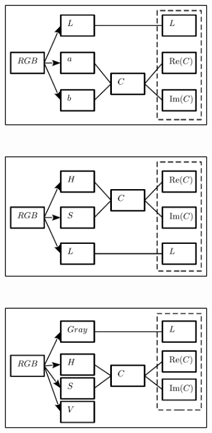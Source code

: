 \documentclass[journal]{IEEEtran}
\begin{document}
\begin{figure}[!ht] 
	\centering
	\begin{subfigure}[b]{0.22\textwidth}
		\centering
		\includegraphics[width=\textwidth]{lab_complex_color}
		\caption{}	
		\label{fig:lab_complex_color}
	\end{subfigure}
	~%
	\begin{subfigure}[b]{0.22\textwidth}
		\centering
		\includegraphics[width=\textwidth]{hsl_complex_color}
		\caption{}	
		\label{fig:hsl_complex_color}
	\end{subfigure}
	~%
	\begin{subfigure}[b]{0.22\textwidth}
		\centering
		\includegraphics[width=\textwidth]{hsv_complex_color}

\end{subfigure}
\end{figure}
\end{document}
